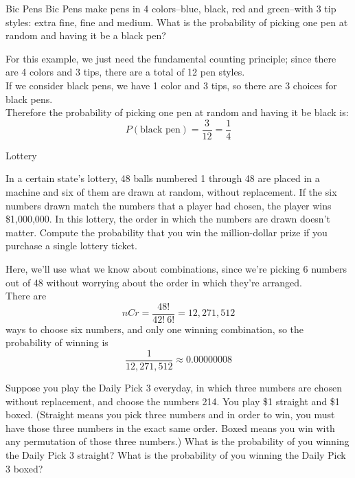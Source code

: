 \begin{example}[https://www.youtube.com/watch?v=d0PaAz2Ro4k&list=PLfmpjsIzhzts14-9s5QixRje97EI2oeMF&index=35]{Bic Pens}
Bic Pens make pens in 4 colors--blue, black, red and green--with 3 tip styles: extra fine, fine and medium. What is the probability of picking one pen at random and having
it be a black pen?

\sol
For this example, we just need the fundamental counting principle; since there are 4 colors and 3 tips, there are a total of 12 pen styles.\\

If we consider black pens, we have 1 color and 3 tips, so there are 3 choices for black pens.\\

Therefore the probability of picking one pen at random and having
it be black is:
\[P(\mbox{black pen}) = \boxed{\frac{3}{12} = \frac{1}{4}}\]
\end{example}

\begin{example}[https://www.youtube.com/watch?v=qJExejyTNzY&list=PLfmpjsIzhzts14-9s5QixRje97EI2oeMF&index=36]{Lottery}

In a certain state's lottery, 48 balls numbered 1 through 48 are placed in a machine and six of them are drawn at random, without replacement. If the six numbers drawn match the numbers that a player had chosen, the player wins \$1,000,000. In this lottery, the order in which the numbers are drawn doesn't matter. Compute the probability that you win the million-dollar prize if you purchase a single lottery ticket.

\sol
Here, we'll use what we know about combinations, since we're picking 6 numbers out of 48 without worrying about the order in which they're arranged.\\

There are \[nCr = \dfrac{48!}{42! \ 6!} = 12,271,512\] ways to choose six numbers, and only one winning combination, so the probability of winning is \[\boxed{\dfrac{1}{12,271,512} \approx 0.00000008}\]
\end{example}

\begin{try}
Suppose you play the Daily Pick 3 everyday, in which three numbers are chosen without replacement, and choose the numbers 214.
You play \$1 straight and \$1 boxed. (Straight means you pick three numbers and in order to
win, you must have those three numbers in the exact same order. Boxed means you win with
any permutation of those three numbers.) What is the probability of you winning the Daily
Pick 3 straight? What is the probability of you winning the Daily Pick 3 boxed?
\end{try}

